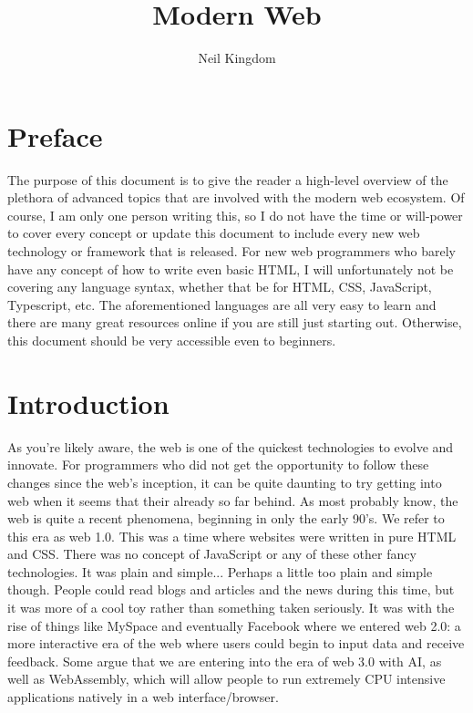\documentclass{article}
\title{Modern Web}
\author{Neil Kingdom}
\begin{document}
\begin{titlingpage}

\maketitle

\end{titlingpage}

\newpage

\tableofcontents

\newpage

\section{Preface}

The purpose of this document is to give the reader a high-level overview of the plethora of advanced topics 
that are involved with the modern web ecosystem. Of course, I am only one person writing this, so I do not 
have the time or will-power to cover every concept or update this document to include every new web 
technology or framework that is released. For new web programmers who barely have any concept of how to write 
even basic HTML, I will unfortunately not be covering any language syntax, whether that be for HTML, CSS, 
JavaScript, Typescript, etc. The aforementioned languages are all very easy to learn and there are many great 
resources online if you are still just starting out. Otherwise, this document should be very accessible even
to beginners. 

\section{Introduction}

As you're likely aware, the web is one of the quickest technologies to evolve and innovate. For programmers 
who did not get the opportunity to follow these changes since the web's inception, it can be quite daunting to 
try getting into web when it seems that their already so far behind. As most probably know, the web is quite a 
recent phenomena, beginning in only the early 90's. We refer to this era as web 1.0. This was a time where 
websites were written in pure HTML and CSS. There was no concept of JavaScript or any of these other fancy 
technologies. It was plain and simple... Perhaps a little too plain and simple though. People could read blogs 
and articles and the news during this time, but it was more of a cool toy rather than something taken seriously. 
It was with the rise of things like MySpace and eventually Facebook where we entered web 2.0: a more interactive 
era of the web where users could begin to input data and receive feedback. Some argue that we are entering into 
the era of web 3.0 with AI, as well as WebAssembly, which will allow people to run extremely CPU intensive 
applications natively in a web interface/browser. 
\end{document}
